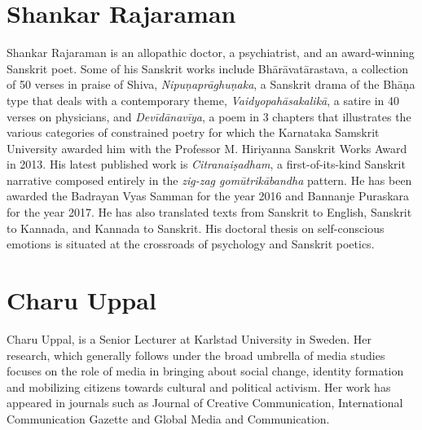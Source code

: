 \section*{Shankar Rajaraman}

Shankar Rajaraman is an allopathic doctor, a psychiatrist, and an award-winning Sanskrit
poet. Some of his Sanskrit works include Bhārāvatārastava, a collection of 50 verses in
praise of Shiva, \textsl{Nipuṇaprāghuṇaka}, a Sanskrit drama of the Bhāṇa type that deals with a
contemporary theme, \textsl{Vaidyopahāsakalikā}, a satire in 40 verses on physicians, and
\textsl{Devīdānavīya}, a poem in 3 chapters that illustrates the various categories of constrained
poetry for which the Karnataka Samskrit University awarded him with the Professor M.
Hiriyanna Sanskrit Works Award in 2013. His latest published work is \textsl{Citranaiṣadham}, a
first-of-its-kind Sanskrit narrative composed entirely in the \textsl{zig-zag gomūtrikābandha} pattern.
He has been awarded the Badrayan Vyas Samman for the year 2016 and Bannanje Puraskara
for the year 2017. He has also translated texts from Sanskrit to English, Sanskrit to Kannada,
and Kannada to Sanskrit. His doctoral thesis on self-conscious emotions is situated at the
crossroads of psychology and Sanskrit poetics.

\section*{Charu Uppal}

Charu Uppal, is a Senior Lecturer at Karlstad University in Sweden. Her research, which
generally follows under the broad umbrella of media studies focuses on the role of media in
bringing about social change, identity formation and mobilizing citizens towards cultural and
political activism. Her work has appeared in journals such as Journal of Creative
Communication, International Communication Gazette and Global Media and
Communication.
